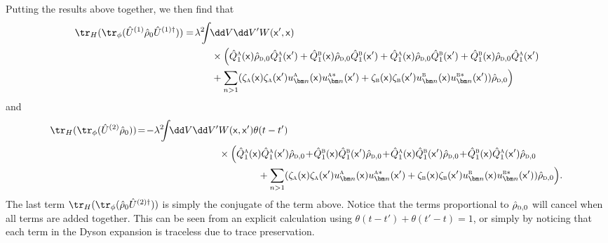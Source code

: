 \documentclass[letterpaper,12pt,titlepage,oneside,final]{book}
\newcommand{\mf}{\mathsf}%
\newcommand{\tc}[1]{\textsc{#1}}
\begin{document}
{Putting the results above together, we then find that{\footnotesize
\begin{align}
    \tr_H(\tr_\phi(\hat{U}^{(1)} \hat{\rho}_0\hat{U}^{(1)\dagger})) = \!\lambda^2\!\!\!\int &\!\dd V \dd V'  W(\mf x' ,\mf x)\\
    & \times \Big( \hat{Q}^{\tc{a}}_1(\mf x)\hat{\rho}_{\tc{d},0}\hat{Q}_1^{\tc{a}}(\mf x')+ \hat{Q}_1^\tc{b}(\mf x)\hat{\rho}_{\tc{d},0}\hat{Q}_1^{\tc{b}}(\mf x')+ \hat{Q}^\tc{a}_1(\mf x)\hat{\rho}_{\tc{d},0}\hat{Q}^{\tc{b}}_1(\mf x') +  \hat{Q}_1^\tc{b}(\mf x) \hat{\rho}_{\tc{d},0}\hat{Q}^{\tc{a}}_1(\mf x') \nonumber\\&+\sum_{n>1}( \zeta_\tc{a}(\mf x)\zeta_\tc{a}(\mf x')u_{\bm n}^{\tc{a}}(\mf x) u_{\bm n}^{\tc{a}*}(\mf x')+\zeta_\tc{b}(\mf x)\zeta_\tc{b}(\mf x')u_{\bm n}^{\tc{b}}(\mf x) u_{\bm n}^{\tc{b}*}(\mf x'))\hat{\rho}_{\tc{d},0}\Big)\nonumber
\end{align}}
and{\footnotesize
\begin{align}
    \!\tr_H(\tr_\phi(\hat{U}^{(2)}\hat{\rho}_0))\! =\! - \lambda^2\!\!\!\int\! \!\dd V \dd V' &W(\mf x, \mf x')\theta(t-t')\\
    &\times\Big( \hat{Q}_1^{\tc{a}}(\mf x)\hat{Q}_1^{\tc{a}}(\mf x')\hat{\rho}_{\tc{d},0}\!+\! \hat{Q}^\tc{b}_1(\mf x)\hat{Q}_1^{\tc{b}}(\mf x')\hat{\rho}_{\tc{d},0}\!+\! \hat{Q}^\tc{a}_1(\mf x)\hat{Q}^\tc{b}_1(\mf x')\hat{\rho}_{\tc{d},0}\! +\! \hat{Q}^\tc{b}_1(\mf x) \hat{Q}^\tc{a}_1(\mf x')\hat{\rho}_{\tc{d},0}\nonumber\\
   &\:\:\:\:\:\:\:\:\:\:\:\:\:\:\:\:\:\:+\sum_{n>1} (\zeta_\tc{a}(\mf x)\zeta_\tc{a}(\mf x')u_{\bm n}^{\tc{a}}(\mf x)  u_{\bm n}^{\tc{a}*}(\mf x')+ \zeta_\tc{b}(\mf x)\zeta_\tc{b}(\mf x')u_{\bm n}^{\tc{b}}(\mf x) u_{\bm n}^{\tc{b}*}(\mf x'))\hat{\rho}_{\tc{d},0}\Big).\nonumber
   \end{align}}
The last term $\tr_H(\tr_\phi(\hat{\rho}_0 \hat{U}^{(2)\dagger}))$ is simply the conjugate of the term above. Notice that the terms proportional to $\hat{\rho}_{\tc{d},0}$ will cancel when all terms are added together. This can be seen from an explicit calculation using $\theta(t-t') + \theta(t'-t) = 1$, or simply by noticing that each term in the Dyson expansion is traceless due to trace preservation. %

}
\end{document}
